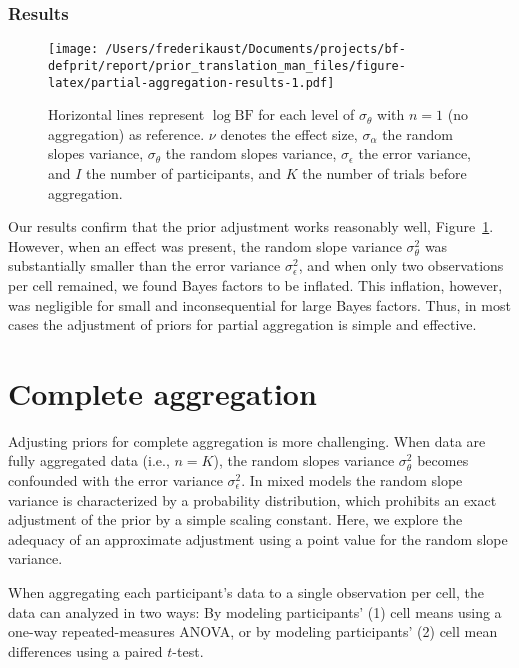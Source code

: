 \documentclass[
  man,floatsintext,draftall]{apa6}
\begin{document}
\hypertarget{results}{%
\subsubsection{Results}\label{results}}



\begin{figure}
\centering
\texttt{[image: /Users/frederikaust/Documents/projects/bf-defprit/report/prior\_translation\_man\_files/figure-latex/partial-aggregation-results-1.pdf]}
\caption{\label{fig:partial-aggregation-results}Horizontal lines represent \(\log{\mathrm{BF}}\) for each level of \(\sigma_\theta\) with \(n = 1\) (no aggregation) as reference. \(\nu\) denotes the effect size, \(\sigma_\alpha\) the random slopes variance, \(\sigma_\theta\) the random slopes variance, \(\sigma_\epsilon\) the error variance, and \(I\) the number of participants, and \(K\) the number of trials before aggregation.}
\end{figure}

Our results confirm that the prior adjustment works reasonably well, Figure~\ref{fig:partial-aggregation-results}.
However, when an effect was present, the random slope variance \(\sigma_\theta^2\) was substantially smaller than the error variance \(\sigma_\epsilon^2\), and when only two observations per cell remained, we found Bayes factors to be inflated.
This inflation, however, was negligible for small and inconsequential for large Bayes factors.
Thus, in most cases the adjustment of priors for partial aggregation is simple and effective.

\hypertarget{complete-aggregation}{%
\section{Complete aggregation}\label{complete-aggregation}}

Adjusting priors for complete aggregation is more challenging.
When data are fully aggregated data (i.e., \(n = K\)), the random slopes variance \(\sigma_\theta^2\) becomes confounded with the error variance \(\sigma_\epsilon^2\).
In mixed models the random slope variance is characterized by a probability distribution, which prohibits an exact adjustment of the prior by a simple scaling constant.
Here, we explore the adequacy of an approximate adjustment using a point value for the random slope variance.

When aggregating each participant's data to a single observation per cell, the data can analyzed in two ways: By modeling participants' (1) cell means using a one-way repeated-measures ANOVA, or by modeling participants' (2) cell mean differences using a paired \(t\)-test.
\end{document}
